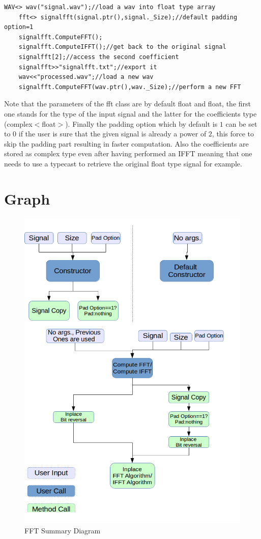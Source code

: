 \documentclass[a4paper]{report}
\begin{document}
\begin{lstlisting}[basicstyle=\tiny]
    WAV<> wav("signal.wav");//load a wav into float type array
    fft<> signalfft(signal.ptr(),signal._Size);//default padding option=1
    signalfft.ComputeFFT();
    signalfft.ComputeIFFT();//get back to the original signal
    signalfft[2];//access the second coefficient
    signalfft>>"signalfft.txt";//export it
    wav<<"processed.wav";//load a new wav
    signalfft.ComputeFFT(wav.ptr(),wav._Size);//perform a new FFT
\end{lstlisting}
Note that the parameters of the fft class are by default float and float, the first one stands for the type of the input signal and the latter for the coefficients type (complex$<$float$>$). Finally the padding option which by default is $1$ can be set to $0$ if the user is sure that the given signal is already a power of $2$, this force to skip the padding part resulting in faster computation. Also the coefficients are stored as complex type even after having performed an IFFT meaning that one needs to use a typecast to retrieve the original float type signal for example.


\section{Graph}
\begin{figure}[H]
\begin{center}
\includegraphics[scale=0.31]{fft_diagram.png}\caption{FFT Summary Diagram}
\end{center}
\end{figure}
\end{document}
